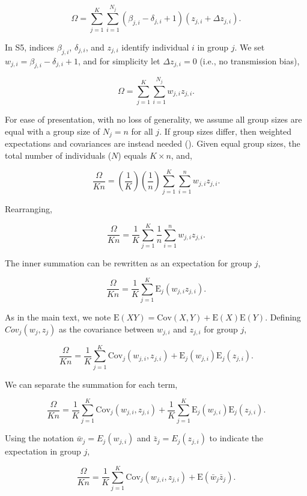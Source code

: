 \documentclass[
]{article}
\begin{document}
\[\Omega = \sum_{j=1}^{K}\sum_{i=1}^{N_{j}}\left(\beta_{j,i} - \delta_{j,i} + 1 \right)\left(z_{j, i} + \Delta z_{j, i}\right).
\tag{S5}
\]

In S5, indices \(\beta_{j, i}\), \(\delta_{j, i}\), and \(z_{j, i}\)
identify individual \(i\) in group \(j\). We set
\(w_{j, i} = \beta_{j, i} - \delta_{j, i} + 1\), and for simplicity let
\(\Delta z_{j, i} = 0\) (i.e., no transmission bias),

\[\Omega = \sum_{j=1}^{K}\sum_{i=1}^{N_{j}}w_{j,i}z_{j, i}.\]

For ease of presentation, with no loss of generality, we assume all
group sizes are equal with a group size of \(N_{j} = n\) for all \(j\).
If group sizes differ, then weighted expectations and covariances are
instead needed (). Given
equal group sizes, the total number of individuals (\(N\)) equals
\(K \times n\), and,

\[\frac{\Omega}{K n} = \left(\frac{1}{K}\right)\left(\frac{1}{n}\right)\sum_{j=1}^{K}\sum_{i=1}^{n}w_{j,i}z_{j, i}.\]

Rearranging,

\[\frac{\Omega}{K n} = \frac{1}{K}\sum_{j=1}^{K}\frac{1}{n}\sum_{i=1}^{n}w_{j,i}z_{j, i}.\]

The inner summation can be rewritten as an expectation for group \(j\),

\[\frac{\Omega}{K n} = \frac{1}{K}\sum_{j=1}^{K}\mathrm{E}_{j}\left(w_{j,i} z_{j,i}\right).\]

As in the main text, we note
\(\mathrm{E}(XY) = \mathrm{Cov}(X,Y) + \mathrm{E}(X)\mathrm{E}(Y)\).
Defining \(Cov_{j}(w_{j}, z_{j})\) as the covariance between \(w_{j,i}\)
and \(z_{j, i}\) for group \(j\),

\[\frac{\Omega}{K n} = \frac{1}{K}\sum_{j=1}^{K}\mathrm{Cov}_{j}\left(w_{j,i}, z_{j,i}\right) + \mathrm{E}_{j}\left(w_{j,i}\right)\mathrm{E}_{j}\left(z_{j,i}\right).\]

We can separate the summation for each term,

\[\frac{\Omega}{K n} = \frac{1}{K}\sum_{j=1}^{K}\mathrm{Cov}_{j}\left(w_{j,i}, z_{j,i}\right) + \frac{1}{K}\sum_{j=1}^{K}\mathrm{E}_{j}\left(w_{j,i}\right)\mathrm{E}_{j}\left(z_{j,i}\right).\]

Using the notation \(\bar{w}_{j} = E_{j}(w_{j,i})\) and
\(\bar{z}_{j} = E_{j}(z_{j,i})\) to indicate the expectation in group
\(j\),

\[\frac{\Omega}{K n} = \frac{1}{K}\sum_{j=1}^{K}\mathrm{Cov}_{j}\left(w_{j,i}, z_{j,i}\right) + \mathrm{E}\left(\bar{w}_{j} \bar{z}_{j} \right).\]
\end{document}
